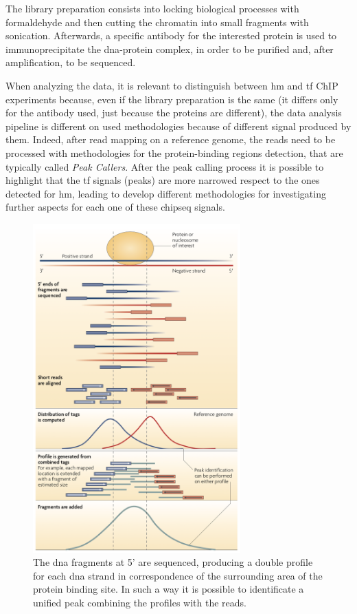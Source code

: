 The library preparation consists into locking biological processes with formaldehyde and then cutting the chromatin into small fragments with sonication.
Afterwards, a specific antibody for the interested protein is used to immunoprecipitate the \gls{dna}-protein complex, in order to be purified and, after amplification, to be sequenced.

When analyzing the data, it is relevant to distinguish between \gls{hm} and \gls{tf} ChIP experiments because, even if the library preparation is the same (it differs only for the antibody used, just because the proteins are different), the data analysis pipeline is different on used methodologies because of different signal produced by them.
Indeed, after read mapping on a reference genome, the reads need to be processed with methodologies for the protein-binding regions detection, that are typically called \textit{Peak Callers}.
After the peak calling process it is possible to highlight that the \gls{tf} signals (peaks) are more narrowed respect to the ones detected for \gls{hm}, leading to develop different methodologies for investigating further aspects for each one of these \gls{chipseq} signals.

\begin{figure}[H]
\centering
\includegraphics[width=8cm, keepaspectratio]{img/intro/peak_call.png}
\caption[\gls{chipseq} peak detection]{The \gls{dna} fragments at 5' are sequenced, producing a double profile for each \gls{dna} strand in correspondence of the surrounding area of the protein binding site.
In such a way it is possible to identificate a unified peak combining the profiles with the reads.\cite{Park2009}}
\label{fig:chipseqexp}
\end{figure}

